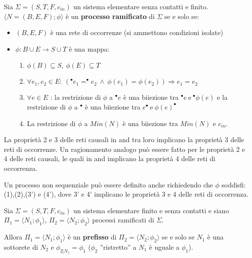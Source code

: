 \begin{definizione}
    Sia $\Sigma = (S,T, F, c_{in})$ un sistema elementare senza contatti e finito. $\langle N = (B, E, F); \phi \rangle$ è un \textbf{processo ramificato} di $\Sigma$ se e solo se:
    \begin{itemize}
        \item $(B, E, F)$ è una rete di occorrenze (si ammettono condizioni isolate)
        \item $\phi: B \cup E \to S \cup T$ è una mappa:
        \begin{enumerate}
            \item $\phi(B) \subseteq S, \ \phi(E) \subseteq T$
            \item $\forall e_1, e_2 \in E: \ ( ^{\bullet} e_1 =  ^{\bullet} e_2 \ \land \ \phi(e_1) = \phi(e_2)) \Rightarrow e_1 = e_2$
            \item $\forall e \in E$ : la restrizione di $\phi$ a $^{\bullet} e$ è una biiezione tra $^{\bullet} e \ \text{e} \ ^{\bullet} \phi(e)$ e la restrizione di $\phi$ a $^{\bullet}$ è una biiezione tra $e^{\bullet} \ \text{e} \ \phi(e)^{\bullet}$
            \item La restrizione di $\phi$ a $Min(N)$ è una biiezione tra $Min(N)$ e $c_{in}$.
        \end{enumerate}
    \end{itemize}
\end{definizione}
La proprietà 2 e 3 delle reti causali in and tra loro implicano la proprietà 3 delle reti di occorrenze. Un ragionamento analogo può essere fatto per le proprietà 2 e 4 delle reti causali, le quali in and implicano la proprietà 4 delle reti di occorrenza.
\begin{nota}
    Un processo non sequenziale può essere definito anche richiedendo che $\phi$ soddisfi: (1),(2),(3') e (4'), dove 3' e 4' implicano le proprietà 3 e 4 delle reti di occorrenza.
\end{nota}
\begin{definizione}
    Sia $\Sigma = (S,T, F, c_{in})$ un sistema elementare finito e senza contatti e siano $\Pi_1 = \langle N_1; \phi_1 \rangle$, $\Pi_2 = \langle N_2; \phi_2 \rangle$ processi ramificati di $\Sigma$.

    Allora $\Pi_1 = \langle N_1; \phi_1 \rangle$ è un \textbf{prefisso} di $\Pi_2 = \langle N_2; \phi_2 \rangle$ se e solo se $N_1$ è una sottorete di $N_2$ e $\phi_{2|N_1} = \phi_1$ ($\phi_2$ ”ristretto” a $N_1$ è uguale a $\phi_1$).
\end{definizione}
